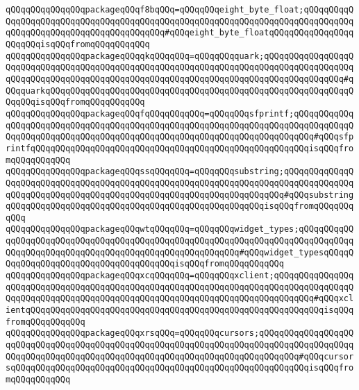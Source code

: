 \verb|qQQqqQQqqQQqqQQqpackageqQQqf8bqQQq=qQQqqQQqeight_byte_float;qQQqqQQqqQQqqQQqqQQqqQQqqQQqqQQqqQQqqQQqqQQqqQQqqQQqqQQqqQQqqQQqqQQqqQQqqQQqqQQqqQQqqQQqqQQqqQQqqQQqqQQqqQQqqQQq#qQQqeight_byte_floatqQQqqQQqqQQqqQQqqQQqqQQqisqQQqfromqQQqqQQqqQQq|\newline
\verb|qQQqqQQqqQQqqQQqpackageqQQqqkqQQqqQQq=qQQqqQQqquark;qQQqqQQqqQQqqQQqqQQqqQQqqQQqqQQqqQQqqQQqqQQqqQQqqQQqqQQqqQQqqQQqqQQqqQQqqQQqqQQqqQQqqQQqqQQqqQQqqQQqqQQqqQQqqQQqqQQqqQQqqQQqqQQqqQQqqQQqqQQqqQQqqQQqqQQqqQQq#qQQqquarkqQQqqQQqqQQqqQQqqQQqqQQqqQQqqQQqqQQqqQQqqQQqqQQqqQQqqQQqqQQqqQQqqQQqisqQQqfromqQQqqQQqqQQq|\newline
\verb|qQQqqQQqqQQqqQQqpackageqQQqfqQQqqQQqqQQq=qQQqqQQqsfprintf;qQQqqQQqqQQqqQQqqQQqqQQqqQQqqQQqqQQqqQQqqQQqqQQqqQQqqQQqqQQqqQQqqQQqqQQqqQQqqQQqqQQqqQQqqQQqqQQqqQQqqQQqqQQqqQQqqQQqqQQqqQQqqQQqqQQqqQQqqQQqqQQq#qQQqsfprintfqQQqqQQqqQQqqQQqqQQqqQQqqQQqqQQqqQQqqQQqqQQqqQQqqQQqqQQqisqQQqfromqQQqqQQqqQQq|\newline
\verb|qQQqqQQqqQQqqQQqpackageqQQqssqQQqqQQq=qQQqqQQqsubstring;qQQqqQQqqQQqqQQqqQQqqQQqqQQqqQQqqQQqqQQqqQQqqQQqqQQqqQQqqQQqqQQqqQQqqQQqqQQqqQQqqQQqqQQqqQQqqQQqqQQqqQQqqQQqqQQqqQQqqQQqqQQqqQQqqQQqqQQqqQQq#qQQqsubstringqQQqqQQqqQQqqQQqqQQqqQQqqQQqqQQqqQQqqQQqqQQqqQQqqQQqisqQQqfromqQQqqQQqqQQq|\newline
\verb|qQQqqQQqqQQqqQQqpackageqQQqwtqQQqqQQq=qQQqqQQqwidget_types;qQQqqQQqqQQqqQQqqQQqqQQqqQQqqQQqqQQqqQQqqQQqqQQqqQQqqQQqqQQqqQQqqQQqqQQqqQQqqQQqqQQqqQQqqQQqqQQqqQQqqQQqqQQqqQQqqQQqqQQqqQQqqQQq#qQQqwidget_typesqQQqqQQqqQQqqQQqqQQqqQQqqQQqqQQqqQQqqQQqisqQQqfromqQQqqQQqqQQq|\newline
\verb|qQQqqQQqqQQqqQQqpackageqQQqxcqQQqqQQq=qQQqqQQqxclient;qQQqqQQqqQQqqQQqqQQqqQQqqQQqqQQqqQQqqQQqqQQqqQQqqQQqqQQqqQQqqQQqqQQqqQQqqQQqqQQqqQQqqQQqqQQqqQQqqQQqqQQqqQQqqQQqqQQqqQQqqQQqqQQqqQQqqQQqqQQqqQQqqQQq#qQQqxclientqQQqqQQqqQQqqQQqqQQqqQQqqQQqqQQqqQQqqQQqqQQqqQQqqQQqqQQqqQQqisqQQqfromqQQqqQQqqQQq|\newline
\verb|qQQqqQQqqQQqqQQqpackageqQQqxrsqQQq=qQQqqQQqcursors;qQQqqQQqqQQqqQQqqQQqqQQqqQQqqQQqqQQqqQQqqQQqqQQqqQQqqQQqqQQqqQQqqQQqqQQqqQQqqQQqqQQqqQQqqQQqqQQqqQQqqQQqqQQqqQQqqQQqqQQqqQQqqQQqqQQqqQQqqQQqqQQqqQQq#qQQqcursorsqQQqqQQqqQQqqQQqqQQqqQQqqQQqqQQqqQQqqQQqqQQqqQQqqQQqqQQqqQQqisqQQqfromqQQqqQQqqQQq|\newline
